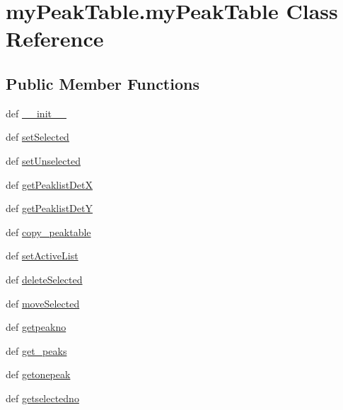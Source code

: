 \hypertarget{classmy_peak_table_1_1my_peak_table}{\section{my\-Peak\-Table.\-my\-Peak\-Table Class Reference}
\label{classmy_peak_table_1_1my_peak_table}
}
\subsection*{Public Member Functions}
\begin{DoxyCompactItemize}
\item 
def \hyperlink{classmy_peak_table_1_1my_peak_table_af91b0ff7c386b74e34eaadf5228fc89c}{\-\_\-\-\_\-init\-\_\-\-\_\-}
\item 
def \hyperlink{classmy_peak_table_1_1my_peak_table_a8171aa9d50a86f7483d840ad094f77c5}{set\-Selected}
\item 
def \hyperlink{classmy_peak_table_1_1my_peak_table_aa543910f172ce15483e4753d848a296e}{set\-Unselected}
\item 
def \hyperlink{classmy_peak_table_1_1my_peak_table_aecda5256aaa268233ca76fc9aa31ea57}{get\-Peaklist\-Det\-X}
\item 
def \hyperlink{classmy_peak_table_1_1my_peak_table_ae754776fe2219a19ea8421154ec97c83}{get\-Peaklist\-Det\-Y}
\item 
def \hyperlink{classmy_peak_table_1_1my_peak_table_ab5033bca2519e7d553ff31abffe31b45}{copy\-\_\-peaktable}
\item 
def \hyperlink{classmy_peak_table_1_1my_peak_table_a2632e23b330621bc8c0db28f103b6f4b}{set\-Active\-List}
\item 
def \hyperlink{classmy_peak_table_1_1my_peak_table_aeae41fc2195c4a8e762733b10bb16037}{delete\-Selected}
\item 
def \hyperlink{classmy_peak_table_1_1my_peak_table_af0e5527f60c61c6c71c5a06740ccbb1a}{move\-Selected}
\item 
def \hyperlink{classmy_peak_table_1_1my_peak_table_afd55f45ebb0ff7a220abfc077476ab7e}{getpeakno}
\item 
def \hyperlink{classmy_peak_table_1_1my_peak_table_ac4307c79c6fbe7939ba91c8b8e863e1e}{get\-\_\-peaks}
\item 
def \hyperlink{classmy_peak_table_1_1my_peak_table_a44cf0204f3e6c72e1e38110aa1c17812}{getonepeak}
\item 
def \hyperlink{classmy_peak_table_1_1my_peak_table_a8d97309248cdbbd80bb15151d57f2d19}{getselectedno}

\end{DoxyCompactItemize}
